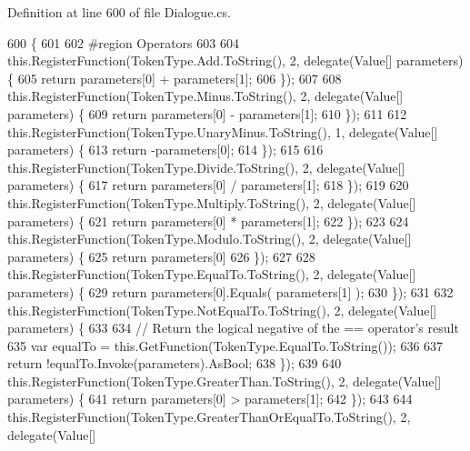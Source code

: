 Definition at line 600 of file Dialogue.\-cs.


\begin{DoxyCode}
600                                      \{
601 
602 \textcolor{preprocessor}{                #region Operators}
603 \textcolor{preprocessor}{}
604                 this.RegisterFunction(TokenType.Add.ToString(), 2, delegate(Value[] parameters) \{
605                     \textcolor{keywordflow}{return} parameters[0] + parameters[1];
606                 \});
607 
608                 this.RegisterFunction(TokenType.Minus.ToString(), 2, delegate(Value[] parameters) \{
609                     \textcolor{keywordflow}{return} parameters[0] - parameters[1];
610                 \});
611 
612                 this.RegisterFunction(TokenType.UnaryMinus.ToString(), 1, delegate(Value[] parameters) \{
613                     \textcolor{keywordflow}{return} -parameters[0];
614                 \});
615 
616                 this.RegisterFunction(TokenType.Divide.ToString(), 2, delegate(Value[] parameters) \{
617                     \textcolor{keywordflow}{return} parameters[0] / parameters[1];
618                 \});
619 
620                 this.RegisterFunction(TokenType.Multiply.ToString(), 2, delegate(Value[] parameters) \{
621                     \textcolor{keywordflow}{return} parameters[0] * parameters[1];
622                 \});
623 
624                 this.RegisterFunction(TokenType.Modulo.ToString(), 2, delegate(Value[] parameters) \{
625                     \textcolor{keywordflow}{return} parameters[0] %
626                 \});
627 
628                 this.RegisterFunction(TokenType.EqualTo.ToString(), 2, delegate(Value[] parameters) \{
629                     \textcolor{keywordflow}{return} parameters[0].Equals( parameters[1] );
630                 \});
631 
632                 this.RegisterFunction(TokenType.NotEqualTo.ToString(), 2, delegate(Value[] parameters) \{
633 
634                     \textcolor{comment}{// Return the logical negative of the == operator's result}
635                     var equalTo = this.GetFunction(TokenType.EqualTo.ToString());
636 
637                     \textcolor{keywordflow}{return} !equalTo.Invoke(parameters).AsBool;
638                 \});
639 
640                 this.RegisterFunction(TokenType.GreaterThan.ToString(), 2, delegate(Value[] parameters) \{
641                     \textcolor{keywordflow}{return} parameters[0] > parameters[1];
642                 \});
643 
644                 this.RegisterFunction(TokenType.GreaterThanOrEqualTo.ToString(), 2, delegate(Value[] 

\end{DoxyCode}
